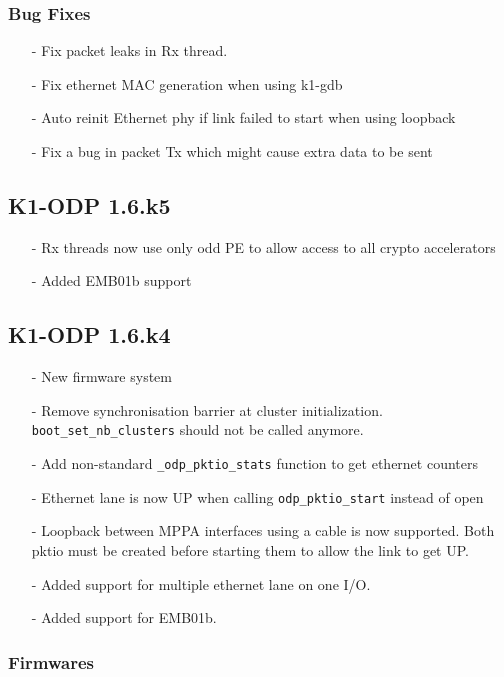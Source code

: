 \documentclass{trkalray}
\begin{document}
\subsubsection{Bug Fixes}
\begin{itemize}
\item[-]{Fix packet leaks in Rx thread.}
\item[-]{Fix ethernet MAC generation when using k1-gdb}
\item[-]{Auto reinit Ethernet phy if link failed to start when using
  loopback}
\item[-]{Fix a bug in packet Tx which might cause extra data to be sent}
\end{itemize}

\subsection{K1-ODP 1.6.k5}
\begin{itemize}
\item[-]{Rx threads now use only odd PE to allow access to all crypto
  accelerators}
\item[-]{Added EMB01b support}
\end{itemize}

\subsection{K1-ODP 1.6.k4}
\begin{itemize}
\item[-]{New firmware system}
\item[-]{Remove synchronisation barrier at cluster
  initialization. \texttt{boot\_set\_nb\_clusters} should not be
  called anymore.}
\item[-]{Add non-standard \texttt{\_odp\_pktio\_stats} function to get
ethernet counters}
\item[-]{Ethernet lane is now UP when calling
  \texttt{odp\_pktio\_start} instead of open}
\item[-]{Loopback between MPPA interfaces using a cable is now
  supported. Both pktio must be created before starting them to allow
  the link to get UP.}
\item[-]{Added support for multiple ethernet lane on one I/O.}
\item[-]{Added support for EMB01b.}
\end{itemize}

\subsubsection{Firmwares}
\end{document}
